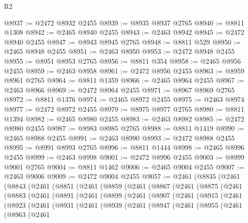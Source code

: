 \begin{lexlean}{R2}
\begin{coremodule}
@8937 := @2472 @8932 @2455
@8939 := @8935 @8937 @2765
@8940 := @8811 @1308
@8942 := @2465 @8940 @2455
@8943 := @2463 @8942
@8945 := @2472 @8940 @2455
@8947 := @8943 @8945 @2765
@8948 := @8811 @529
@8950 := @2465 @8948 @2455
@8951 := @2463 @8950
@8953 := @2472 @8948 @2455
@8955 := @8951 @8953 @2765
@8956 := @8811 @354
@8958 := @2465 @8956 @2455
@8959 := @2463 @8958
@8961 := @2472 @8956 @2455
@8963 := @8959 @8961 @2765
@8964 := @8811 @1359
@8966 := @2465 @8964 @2455
@8967 := @2463 @8966
@8969 := @2472 @8964 @2455
@8971 := @8967 @8969 @2765
@8972 := @8811 @1376
@8974 := @2465 @8972 @2455
@8975 := @2463 @8974
@8977 := @2472 @8972 @2455
@8979 := @8975 @8977 @2765
@8980 := @8811 @1394
@8982 := @2465 @8980 @2455
@8983 := @2463 @8982
@8985 := @2472 @8980 @2455
@8987 := @8983 @8985 @2765
@8988 := @8811 @1419
@8990 := @2465 @8988 @2455
@8991 := @2463 @8990
@8993 := @2472 @8988 @2455
@8995 := @8991 @8993 @2765
@8996 := @8811 @1444
@8998 := @2465 @8996 @2455
@8999 := @2463 @8998
@9001 := @2472 @8996 @2455
@9003 := @8999 @9001 @2765
@9004 := @8811 @1462
@9006 := @2465 @9004 @2455
@9007 := @2463 @9006
@9009 := @2472 @9004 @2455
@9057 := @2461
    (@8835
      (@2461
        (@8843
          (@2461
            (@8851
              (@2461
                (@8859
                  (@2461
                    (@8867
                      (@2461
                        (@8875
                          (@2461
                            (@8883
                              (@2461
                                (@8891
                                  (@2461
                                    (@8899
                                      (@2461
                                        (@8907
                                          (@2461
                                            (@8915
                                              (@2461
                                                (@8923
                                                  (@2461
                                                    (@8931
                                                      (@2461
                                                        (@8939
                                                          (@2461
                                                            (@8947
                                                              (@2461
                                                                (@8955
                                                                  (@2461
                                                                    (@8963
                                                                      (@2461

\end{coremodule}
\end{lexlean}
